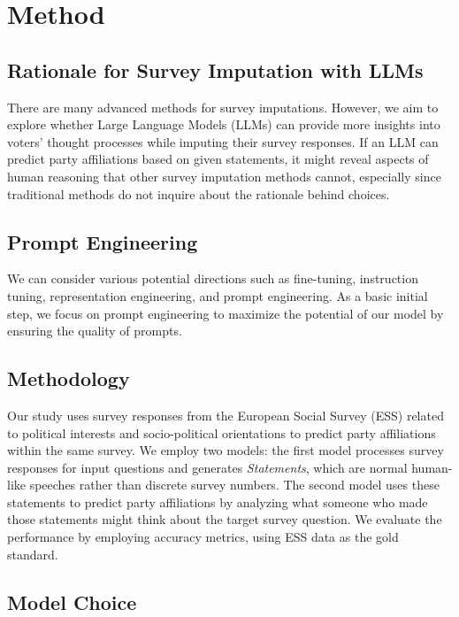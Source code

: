 \section{Method}

\subsection*{Rationale for Survey Imputation with LLMs}

There are many advanced methods for survey imputations. However, we aim to explore whether Large Language Models (LLMs) can provide more insights into voters' thought processes while imputing their survey responses. If an LLM can predict party affiliations based on given statements, it might reveal aspects of human reasoning that other survey imputation methods cannot, especially since traditional methods do not inquire about the rationale behind choices.

\subsection*{Prompt Engineering}

We can consider various potential directions such as fine-tuning, instruction tuning, representation engineering, and prompt engineering. As a basic initial step, we focus on prompt engineering to maximize the potential of our model by ensuring the quality of prompts.

\subsection*{Methodology}

Our study uses survey responses from the European Social Survey (ESS) related to political interests and socio-political orientations to predict party affiliations within the same survey. We employ two models: the first model processes survey responses for input questions and generates \textit{Statements}, which are normal human-like speeches rather than discrete survey numbers. The second model uses these statements to predict party affiliations by analyzing what someone who made those statements might think about the target survey question. We evaluate the performance by employing accuracy metrics, using ESS data as the gold standard.

\subsection*{Model Choice}

